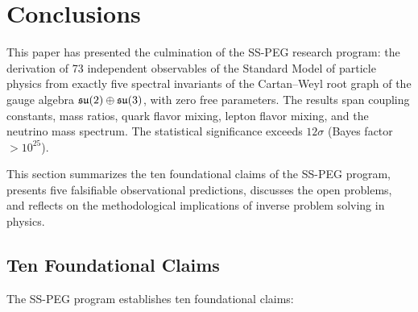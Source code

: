 \section{Conclusions}\label{sec:conclusions}

This paper has presented the culmination of the SS-PEG research program: the derivation of 73 independent observables of the Standard Model of particle physics from exactly five spectral invariants of the Cartan--Weyl root graph of the gauge algebra $\mathfrak{su}(2) \oplus \mathfrak{su}(3)$, with zero free parameters. The results span coupling constants, mass ratios, quark flavor mixing, lepton flavor mixing, and the neutrino mass spectrum. The statistical significance exceeds $12\sigma$ (Bayes factor $> 10^{25}$).

This section summarizes the ten foundational claims of the SS-PEG program, presents five falsifiable observational predictions, discusses the open problems, and reflects on the methodological implications of inverse problem solving in physics.

\subsection{Ten Foundational Claims}\label{sec:ten_claims}

The SS-PEG program establishes ten foundational claims:

